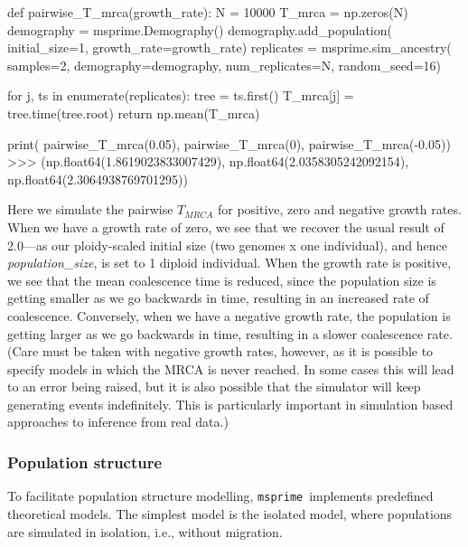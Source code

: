 \documentclass[graybox]{svmult}
\newcommand{\msprime}[0]{\texttt{msprime}}
\begin{document}
\begin{pythoncode}
def pairwise_T_mrca(growth_rate):
    N = 10000
    T_mrca = np.zeros(N)
    demography = msprime.Demography()
    demography.add_population(
        initial_size=1, growth_rate=growth_rate)
    replicates = msprime.sim_ancestry(
        samples=2, demography=demography,
        num_replicates=N, random_seed=16)

    for j, ts in enumerate(replicates):
        tree = ts.first()
        T_mrca[j] = tree.time(tree.root)
    return np.mean(T_mrca)

print(
    pairwise_T_mrca(0.05), pairwise_T_mrca(0),
    pairwise_T_mrca(-0.05))
>>> (np.float64(1.8619023833007429),
     np.float64(2.0358305242092154),
     np.float64(2.3064938769701295))
\end{pythoncode}

    Here we simulate the pairwise \(T_{MRCA}\) for positive, zero and
negative growth rates. When we have a growth rate of zero, we see that we
recover the usual result of 2.0—as our ploidy-scaled initial size (two genomes x one individual), and hence \emph{population\_size},
is set to 1 diploid individual. When the growth rate is positive, we see that the
mean coalescence time is reduced, since the population size is getting
smaller as we go backwards in time, resulting in an increased rate of
coalescence. Conversely, when we have a negative growth rate, the
population is getting larger as we go backwards in time, resulting in a
slower coalescence rate. (Care must be taken with negative growth rates,
however, as it is possible to specify models in which the MRCA is never
reached. In some cases this will lead to an error being raised, but it
is also possible that the simulator will keep generating events
indefinitely. This is particularly important in simulation based
approaches to inference from real data.)


\subsubsection{Population structure}\label{population-structure}
To facilitate population structure modelling, \msprime\ implements
predefined theoretical models. The simplest model is the isolated model,
where populations are simulated in isolation, i.e., without migration.

\label{isolated-model} \
\end{document}
